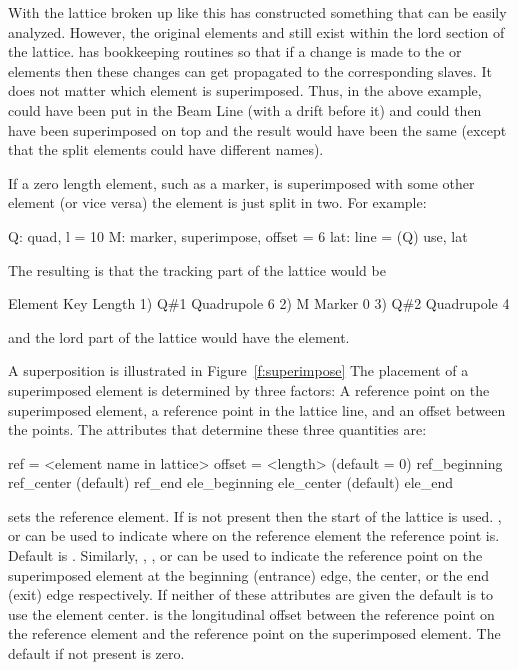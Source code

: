 With the lattice broken up like this \bmad has constructed something
that can be easily analyzed. However, the original elements  and
 still exist within the lord section of the lattice. \bmad has
bookkeeping routines so that if a change is made to the  or
 elements then these changes can get propagated to the
corresponding slaves. It does not matter which element is
superimposed. Thus, in the above example,  could have been put
in the Beam Line (with a drift before it) and  could then have
been superimposed on top and the result would have been the same
(except that the split elements could have different names).

If a zero length element, such as a marker, is superimposed with some
other element (or vice versa) the element is just split in two. For
example:
\begin{example}
  Q: quad, l = 10
  M: marker, superimpose, offset = 6
  lat: line = (Q)
  use, lat
\end{example}
The resulting is that the tracking part of the lattice would be
\begin{example}
        Element   Key           Length
  1)    Q{\#}1       Quadrupole    6
  2)    M         Marker        0
  3)    Q{\#}2       Quadrupole    4
\end{example}
and the lord part of the lattice would have the  element.
 
A superposition is illustrated in Figure~\ref{f:superimpose} The
placement of a superimposed element is determined by three factors: A
reference point on the superimposed element, a reference point in the
lattice line, and an offset between the points. The attributes that
determine these three quantities are: 
\begin{example}
  ref = <element name in lattice>
  offset = <length>      (default = 0)
  ref_beginning
  ref_center             (default)
  ref_end
  ele_beginning
  ele_center             (default)
  ele_end
\end{example}
 sets the reference element. If  is not present then
the start of the lattice is used. , 
or  can be used to indicate where on the reference element
the reference point is. Default is . Similarly,
, , or  can be used to
indicate the reference point on the superimposed element at the
beginning (entrance) edge, the center, or the end (exit) edge
respectively. If neither of these attributes are given the default is
to use the element center.  is the longitudinal offset
between the reference point on the reference element and the reference
point on the superimposed element. The default if not present is zero.

